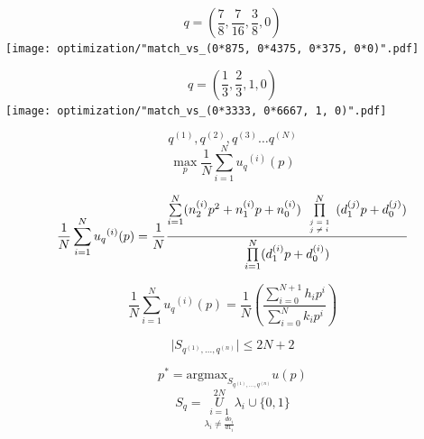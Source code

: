 \documentclass{beamer}
\begin{document}
\begin{frame}
\centering
   \Large \[ q=\left(\frac{7}{8}, \frac{7}{16}, \frac{3}{8}, 0 \right) \]
      \texttt{[image: optimization/"match\_vs\_(0*875, 0*4375, 0*375, 0*0)".pdf]}
\end{frame}

\begin{frame}
\centering
   \Large \[ q=\left( \frac{1}{3}, \frac{2}{3}, 1, 0 \right) \]
      \texttt{[image: optimization/"match\_vs\_(0*3333, 0*6667, 1, 0)".pdf]}
\end{frame}

\begin{frame}
\begin{block}
\huge
\[ q^{(1)}, q^{(2)}, q^{(3)} \dots q^{(N)} \]
\vfill
\large
\begin{equation*}
  \max_p \frac{1}{N} \sum_{i=1} ^ {N} {u_q}^{(i)} (p) 
\end{equation*}
\end{block}
\end{frame}

\begin{frame}
    \begin{block}
    \huge
    \[\frac{1}{N} \sum_{i=1} ^ {N} {u_q}^{(i)} (p) = \frac{1}{N}
    \frac{\sum\limits_{i=1} ^ {N} (n_2^{(i)} p^2 + n_1^{(i)} p + n_0^
    {(i)}) \prod\limits_{\tiny\begin{array}{l} j=1 \\ j \neq i \end{array}} ^ 
    N (d_1 ^ {(j)}p +
    d_0 ^ {(j)})}{\prod\limits_{i=1} ^ N (d_1 ^ {(i)}p +
    d_0 ^ {(i)})}\]
    \end{block}
\end{frame}

\begin{frame}
    \begin{block}
    \huge
    \[\frac{1}{N} \sum_{i=1} ^ {N} {u_q}^{(i)} (p) =
      \frac{1}{N}\left(\frac{\sum\limits_{i=0}^{N+1} h_i p^i} {\sum\limits_{i=0}^{N}
      k_i p^i}\right)\]
    \end{block}
\end{frame}

\begin{frame}
    \begin{block}
    \huge
    \[\mid S_{q^{(1)}, \dots, q^{(n)}} \mid  \leq 2N + 2  \]
    \end{block}
\end{frame}

\begin{frame}
    \begin{block}
    \huge
    \[  p^* = \text{argmax}_{S_{q^{(1)}, \dots, q^{(n)}}} u (p)  \]
    \vfill
    \[ S_{q} =  \overset{2N}{\underset{\lambda_i \neq \frac{do_i}{d1_i}}{\underset{i=1}{U}}} \lambda_i \cup \{0, 1\} \]
    \end{block}
\end{frame}
\end{document}

